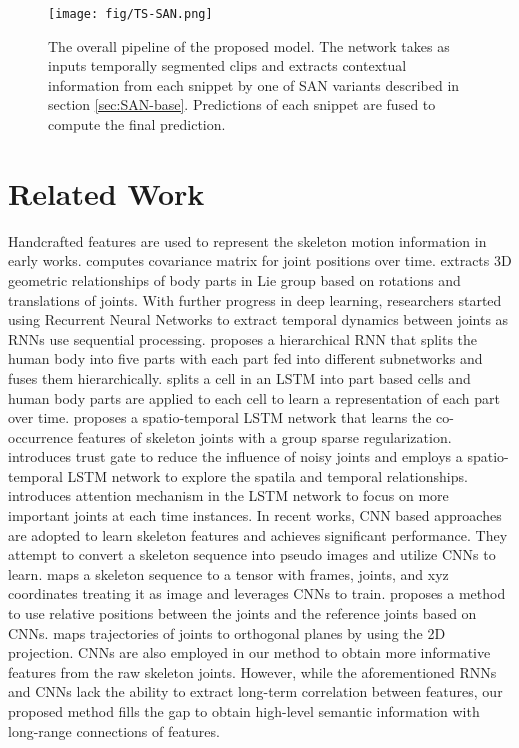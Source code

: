 \documentclass[10pt,twocolumn,letterpaper]{article}
\begin{document}
\begin{figure}[!t]
	\centering
	\texttt{[image: fig/TS-SAN.png]}
	\caption{The overall pipeline of the proposed model. The network takes as inputs temporally segmented clips and extracts contextual information from each snippet by one of SAN variants described in section \ref{sec:SAN-base}. Predictions of each snippet are fused to compute the final prediction.
	}
	\label{fig:overall}
\end{figure}

\section{Related Work}
Handcrafted features are used to represent the skeleton motion information in early works. \cite{related_covariance} computes covariance matrix for joint positions over time. \cite{related_geometry} extracts 3D geometric relationships of body parts in Lie group based on rotations and translations of joints. With further progress in deep learning, researchers started using Recurrent Neural Networks to extract temporal dynamics between joints as RNNs use sequential processing. \cite{STOA:H-RNN} proposes a hierarchical RNN that splits the human body into five parts with each part fed into different subnetworks and fuses them hierarchically. \cite{STOA:PA-LSTM} splits a cell in an LSTM into part based cells and human body parts are applied to each cell to learn a representation of each part over time. \cite{related_co-occur} proposes a spatio-temporal LSTM network that learns the co-occurrence features of skeleton joints with a group sparse regularization. \cite{STOA:TG_ST-LSTM} introduces trust gate to reduce the influence of noisy joints and employs a spatio-temporal LSTM network to explore the spatila and temporal relationships. \cite{STOA:STA-LSTM} introduces attention mechanism in the LSTM network to focus on more important joints at each time instances.
In recent works, CNN based approaches \cite{related_conv1, related_conv2, related_conv3, related_conv4} are adopted to learn skeleton features and achieves significant performance. They attempt to convert a skeleton sequence into pseudo images and utilize CNNs to learn. \cite{related_conv2} maps a skeleton sequence to a tensor with frames, joints, and xyz coordinates treating it as image and leverages CNNs to train. \cite{related_conv1} proposes a method to use relative positions between the joints and the reference joints based on CNNs. \cite{related_conv4} maps trajectories of joints to orthogonal planes by using the 2D projection.
CNNs are also employed in our method to obtain more informative features from the raw skeleton joints. However, while the aforementioned RNNs and CNNs lack the ability to extract long-term correlation between features, our proposed method fills the gap to obtain high-level semantic information with long-range connections of features.
\end{document}
